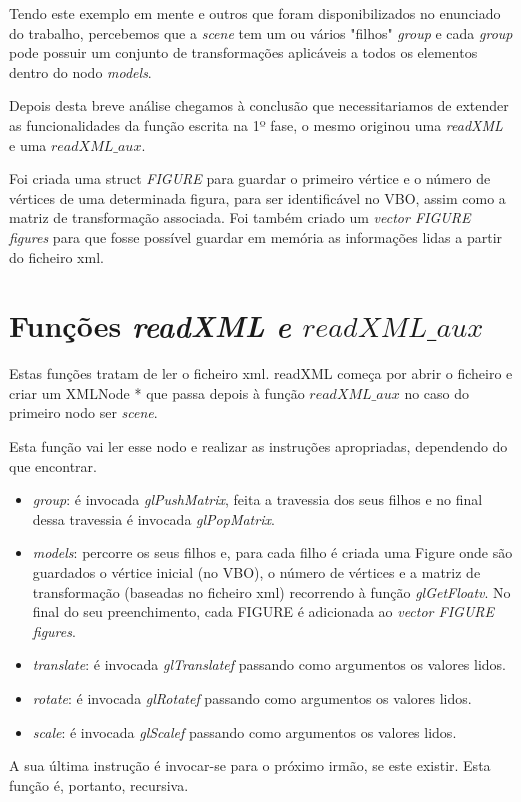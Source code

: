 \documentclass[11pt,a4paper]{report}
\begin{document}
Tendo este exemplo em mente e outros que foram disponibilizados no enunciado do trabalho, percebemos que a \emph{scene} tem um ou vários "filhos" \emph{group} e cada \emph{group} pode possuir um conjunto de transformações aplicáveis a todos os elementos dentro do nodo \emph{models}.

Depois desta breve análise chegamos à conclusão que necessitariamos de extender as funcionalidades da função escrita na 1º fase, o mesmo originou uma \emph{readXML} e uma {$readXML\_aux$}.

Foi criada uma struct \emph{FIGURE} para guardar o primeiro vértice e o número de vértices de uma determinada figura, para ser identificável no VBO, assim como a matriz de transformação associada. 
Foi também criado um \emph{vector FIGURE figures} para que fosse possível guardar em memória as informações lidas a partir do ficheiro xml.

\section{Funções \emph{readXML e {$readXML\_aux$} }}

Estas funções tratam de ler o ficheiro xml. readXML começa por abrir o ficheiro e criar um XMLNode * que passa depois à função {$readXML\_aux$} no caso do primeiro nodo ser \emph{scene}. 

Esta função vai ler esse nodo e realizar as instruções apropriadas, dependendo do que encontrar. 
\begin{itemize}
\item \emph{group}: é invocada \emph{glPushMatrix}, feita a travessia dos seus filhos e no final dessa travessia é invocada \emph{glPopMatrix}.
\item \emph{models}: percorre os seus filhos e, para cada filho é criada uma Figure onde são guardados o vértice inicial (no VBO), o número de vértices e a matriz de transformação (baseadas no ficheiro xml) recorrendo à função \emph{glGetFloatv}. No final do seu preenchimento, cada FIGURE é adicionada ao \emph{vector FIGURE figures}.

\item \emph{translate}: é invocada \emph{glTranslatef} passando como argumentos os valores lidos. 
\item \emph{rotate}: é invocada \emph{glRotatef} passando como argumentos os valores lidos.
\item \emph{scale}: é invocada \emph{glScalef} passando como argumentos os valores lidos.
\end{itemize}
A sua última instrução é invocar-se para o próximo irmão, se este existir. Esta função é, portanto, recursiva.
\end{document}
